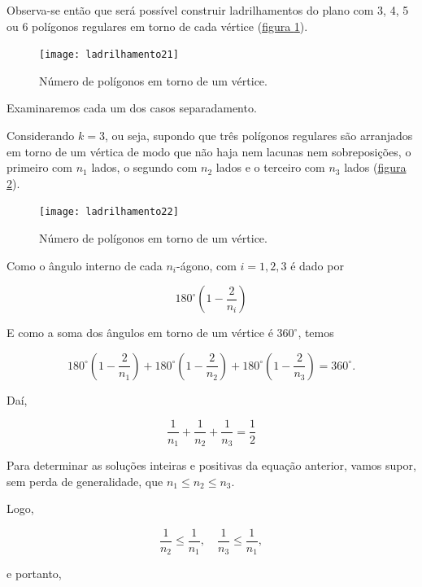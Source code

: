 Observa-se então que será possível construir ladrilhamentos do plano com 3, 4, 5 ou 6 polígonos regulares em torno de cada vértice (\hyperref[lad_tp3]{figura \ref{lad_tp3}}).

\begin{figure}[H]
\centering
\texttt{[image: ladrilhamento21]}
\caption{Número de polígonos em torno de um vértice.}
\label{lad_tp3}
\end{figure}

Examinaremos cada um dos casos separadamento.

Considerando $k=3$, ou seja, supondo que três polígonos regulares são arranjados em torno de um vértica de modo que não haja nem lacunas nem sobreposições, o primeiro com $n_1$ lados, o segundo com $n_2$ lados e o terceiro com $n_3$ lados (\hyperref[lad_tp4]{figura \ref{lad_tp4}}).

\begin{figure}[H]
\centering
\texttt{[image: ladrilhamento22]}
\caption{Número de polígonos em torno de um vértice.}
\label{lad_tp4}
\end{figure}

Como o ângulo interno de cada $n_i$-ágono, com $i=1,2,3$ é dado por

\begin{equation*}
180^{\circ}\left(1-\frac{2}{n_i}\right)
\end{equation*}

E como a soma dos ângulos em torno de um vértice é $360^{\circ}$, temos

\begin{equation*}
180^{\circ}\left(1-\frac{2}{n_1}\right)+180^{\circ}\left(1-\frac{2}{n_2}\right)+180^{\circ}\left(1-\frac{2}{n_3}\right)=360^{\circ}.
\end{equation*}

Daí,

\begin{equation*}
\frac{1}{n_1}+\frac{1}{n_2}+\frac{1}{n_3}=\frac{1}{2}
\end{equation*}

Para determinar as soluções inteiras e positivas da equação anterior, vamos supor, sem perda de generalidade, que $n_1\leq n_2\leq n_3$.

Logo,

\begin{equation*}
\frac{1}{n_2}\leq\frac{1}{n_1},\quad \frac{1}{n_3}\leq\frac{1}{n_1},
\end{equation*}

e portanto,

